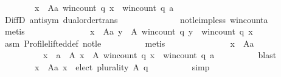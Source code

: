 \begin{isabellebody}
\ \ \ \ \ \ \ \ {\isachardoublequoteopen}{\isasymforall}x\ {\isasymin}\ A{\isacharminus}{\kern0pt}{\isacharbraceleft}{\kern0pt}a{\isacharbraceright}{\kern0pt}{\isachardot}{\kern0pt}\ win{\isacharunderscore}{\kern0pt}count\ q\ x\ {\isacharless}{\kern0pt}\ win{\isacharunderscore}{\kern0pt}count\ q\ a{\isachardoublequoteclose}\isanewline
\ \ \ \ \ \ \ \ \isamarkupfalse%
\ DiffD{}\ antisym\ dual{\isacharunderscore}{\kern0pt}order{\isachardot}{\kern0pt}trans\isanewline
\ \ \ \ \ \ \ \ \ \ \ \ \ \ not{\isacharunderscore}{\kern0pt}le{\isacharunderscore}{\kern0pt}imp{\isacharunderscore}{\kern0pt}less\ win{\isacharunderscore}{\kern0pt}count{\isacharunderscore}{\kern0pt}a\isanewline
\ \ \ \ \ \ \ \ \isamarkupfalse%
\ metis\isanewline
\ \ \ \ \ \ \isamarkupfalse%
\isanewline
\ \ \ \ \ \ \ \ {\isachardoublequoteopen}{\isasymforall}x\ {\isasymin}\ A{\isacharminus}{\kern0pt}{\isacharbraceleft}{\kern0pt}a{\isacharbraceright}{\kern0pt}{\isachardot}{\kern0pt}\ {\isasymnot}{\isacharparenleft}{\kern0pt}{\isasymforall}y\ {\isasymin}\ A{\isachardot}{\kern0pt}\ win{\isacharunderscore}{\kern0pt}count\ q\ y\ {\isasymle}\ win{\isacharunderscore}{\kern0pt}count\ q\ x{\isacharparenright}{\kern0pt}{\isachardoublequoteclose}\isanewline
\ \ \ \ \ \ \ \ \isamarkupfalse%
\ asm{}\ Profile{\isachardot}{\kern0pt}lifted{\isacharunderscore}{\kern0pt}def\ not{\isacharunderscore}{\kern0pt}le\isanewline
\ \ \ \ \ \ \ \ \isamarkupfalse%
\ metis\isanewline
\ \ \ \ \ \ \isamarkupfalse%
\isanewline
\ \ \ \ \ \ \ \ {\isachardoublequoteopen}{\isasymforall}x\ {\isasymin}\ A{\isacharminus}{\kern0pt}{\isacharbraceleft}{\kern0pt}a{\isacharbraceright}{\kern0pt}{\isachardot}{\kern0pt}\isanewline
\ \ \ \ \ \ \ \ \ \ x\ {\isasymnotin}\ {\isacharbraceleft}{\kern0pt}a\ {\isasymin}\ A{\isachardot}{\kern0pt}\ {\isasymforall}x\ {\isasymin}\ A{\isachardot}{\kern0pt}\ win{\isacharunderscore}{\kern0pt}count\ q\ x\ {\isasymle}\ win{\isacharunderscore}{\kern0pt}count\ q\ a{\isacharbraceright}{\kern0pt}{\isachardoublequoteclose}\isanewline
\ \ \ \ \ \ \ \ \isamarkupfalse%
\ blast\isanewline
\ \ \ \ \ \ \isamarkupfalse%
\isanewline
\ \ \ \ \ \ \ \ {\isachardoublequoteopen}{\isasymforall}x\ {\isasymin}\ A{\isacharminus}{\kern0pt}{\isacharbraceleft}{\kern0pt}a{\isacharbraceright}{\kern0pt}{\isachardot}{\kern0pt}\ x\ {\isasymnotin}\ elect\ plurality\ A\ q{\isachardoublequoteclose}\isanewline
\ \ \ \ \ \ \ \ \isamarkupfalse%
\ simp\isanewline
\ \ \ \ \ \ \isamarkupfalse%

\end{isabellebody}
